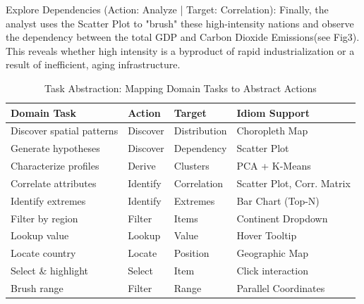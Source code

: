 \documentclass[conference]{IEEEtran}
\begin{document}
 Explore Dependencies (Action: Analyze | Target: Correlation): Finally, the analyst uses the Scatter Plot to "brush" these high-intensity nations and observe the dependency between the total GDP and Carbon Dioxide Emissions(see Fig3). This reveals whether high intensity is a byproduct of rapid industrialization or a result of inefficient, aging infrastructure.

\begin{table}[h]
\centering
\caption{Task Abstraction: Mapping Domain Tasks to Abstract Actions}
\label{tab:task_abstraction}
\small
\begin{tabular}{|p{1.8cm}|p{1.8cm}|p{1.5cm}|p{2.0cm}|}
\hline
\textbf{Domain Task} & \textbf{Action} & \textbf{Target} & \textbf{Idiom Support} \\
\hline
Discover spatial patterns & Discover & Distribution & Choropleth Map \\
\hline
Generate hypotheses & Discover & Dependency & Scatter Plot \\
\hline
Characterize profiles & Derive & Clusters & PCA + K-Means \\
\hline
Correlate attributes & Identify & Correlation & Scatter Plot, Corr. Matrix \\
\hline
Identify extremes & Identify & Extremes & Bar Chart (Top-N) \\
\hline
Filter by region & Filter & Items & Continent Dropdown \\
\hline
Lookup value & Lookup & Value & Hover Tooltip \\
\hline
Locate country & Locate & Position & Geographic Map \\
\hline
Select \& highlight & Select & Item & Click interaction \\
\hline
Brush range & Filter & Range & Parallel Coordinates \\
\hline
\end{tabular}
\end{table}
\end{document}
